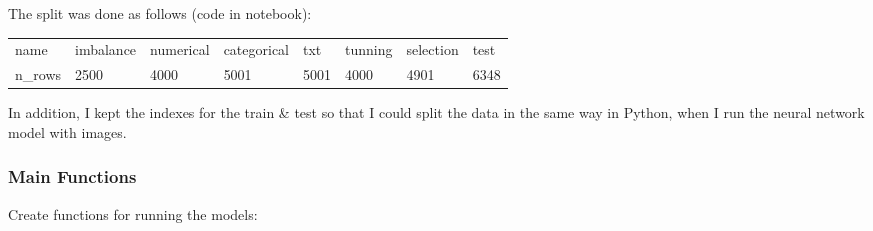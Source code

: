 \documentclass[
]{article}
\begin{document}
The split was done as follows (code in notebook):

\begin{table}[H]
\centering\begingroup\fontsize{10}{12}\selectfont

\begin{tabular}{llllllll}
\toprule
\rowcolor{gray!6}  name & imbalance & numerical & categorical & txt & tunning & selection & test\\
n\_rows & 2500 & 4000 & 5001 & 5001 & 4000 & 4901 & 6348\\
\bottomrule
\end{tabular}
\endgroup{}
\end{table}

In addition, I kept the indexes for the train \& test so that I could
split the data in the same way in Python, when I run the neural network
model with images.

\hypertarget{main-functions}{%
\subsubsection{Main Functions}\label{main-functions}}

Create functions for running the models:
\end{document}
